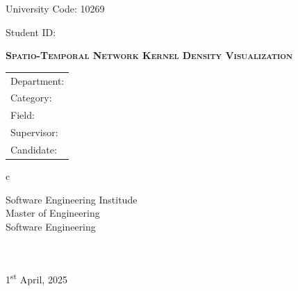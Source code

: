 \newpage

\pagestyle{empty}

\newline
\hspace*{\fill} {University Code: 10269}\\
\hspace*{\fill} {Student ID: 

}%

\vskip 2cm

\begin{center}
    \vspace{1cm}
    {}
\end{center}

\vskip 3cm

\begin{center}
    \bfseries{\scshape{\huge Spatio-Temporal Network Kernel Density Visualization}}\\
\end{center}

\vskip 2cm {\large
        \begin{center}
            \begin{tabular}{l}
                Department:         \\
                Category:              \\
                Field: \\
                Supervisor:         \\
                Candidate:
            \end{tabular}
            \begin{tabular}c

                Software Engineering Institude \\
                \hline Master of Engineering\\
                \hline Software Engineering \\
                \hline \\
                \hline \\


                \hline
            \end{tabular}
        \end{center}}

\vskip 30mm

\begin{center}
    {\Large 1\textsuperscript{st} April, 2025}
\end{center}

\cleardoublepage